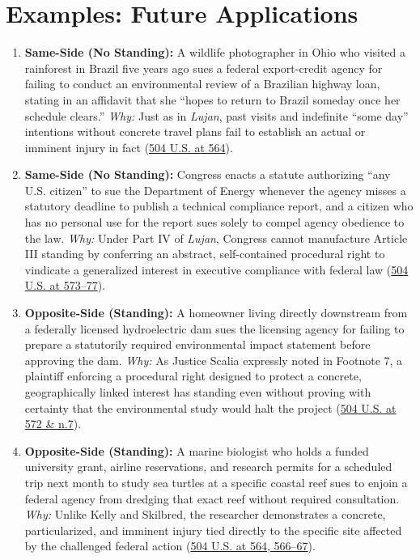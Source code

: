 \documentclass[12pt]{article}
\begin{document}
\section{Examples: Future Applications}
\begin{enumerate}
\item \textbf{Same-Side (No Standing):} A wildlife photographer in Ohio who visited a rainforest in Brazil five years ago sues a federal export-credit agency for failing to conduct an environmental review of a Brazilian highway loan, stating in an affidavit that she ``hopes to return to Brazil someday once her schedule clears.'' \textit{Why:} Just as in \textit{Lujan}, past visits and indefinite ``some day'' intentions without concrete travel plans fail to establish an actual or imminent injury in fact (\href{https://supreme.justia.com/cases/federal/us/504/555/}{504 U.S. at 564}).
\item \textbf{Same-Side (No Standing):} Congress enacts a statute authorizing ``any U.S. citizen'' to sue the Department of Energy whenever the agency misses a statutory deadline to publish a technical compliance report, and a citizen who has no personal use for the report sues solely to compel agency obedience to the law. \textit{Why:} Under Part IV of \textit{Lujan}, Congress cannot manufacture Article III standing by conferring an abstract, self-contained procedural right to vindicate a generalized interest in executive compliance with federal law (\href{https://supreme.justia.com/cases/federal/us/504/555/}{504 U.S. at 573--77}).
\item \textbf{Opposite-Side (Standing):} A homeowner living directly downstream from a federally licensed hydroelectric dam sues the licensing agency for failing to prepare a statutorily required environmental impact statement before approving the dam. \textit{Why:} As Justice Scalia expressly noted in Footnote 7, a plaintiff enforcing a procedural right designed to protect a concrete, geographically linked interest has standing even without proving with certainty that the environmental study would halt the project (\href{https://supreme.justia.com/cases/federal/us/504/555/}{504 U.S. at 572 \& n.7}).
\item \textbf{Opposite-Side (Standing):} A marine biologist who holds a funded university grant, airline reservations, and research permits for a scheduled trip next month to study sea turtles at a specific coastal reef sues to enjoin a federal agency from dredging that exact reef without required consultation. \textit{Why:} Unlike Kelly and Skilbred, the researcher demonstrates a concrete, particularized, and imminent injury tied directly to the specific site affected by the challenged federal action (\href{https://supreme.justia.com/cases/federal/us/504/555/}{504 U.S. at 564, 566--67}).

\end{enumerate}
\end{document}
